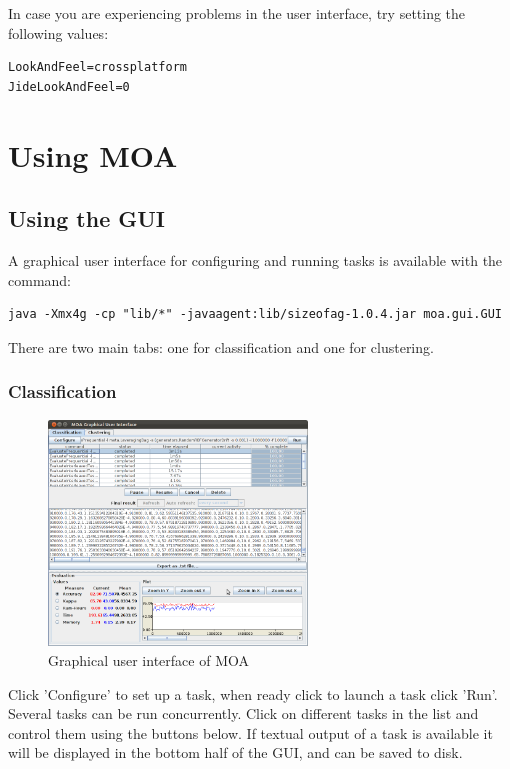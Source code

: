 \documentclass[a4paper,12pt,twoside]{book}
\begin{document}
In case you are experiencing problems in the user interface, try setting the
following values:
{\scriptsize
\begin{verbatim}
LookAndFeel=crossplatform
JideLookAndFeel=0
\end{verbatim}}

\chapter{Using MOA}
\section{Using the GUI}
A graphical user interface for configuring and running tasks is available with the command:

\begin{verbatim}
java -Xmx4g -cp "lib/*" -javaagent:lib/sizeofag-1.0.4.jar moa.gui.GUI
\end{verbatim}

There are two main tabs: one for classification and one for clustering.

\subsection{Classification}

\begin{figure}[ht]
\begin{center}
\includegraphics[height=6cm]{figures/MOA_Task.png}\end{center}
\caption{Graphical user interface of MOA}
\end{figure}

Click 'Configure' to set up a task, when ready click to launch a task click 'Run'. Several tasks can be run concurrently. Click on different tasks in the list and control them using the buttons below. If textual output of a task is available it will be displayed in the bottom half of the GUI, and can be saved to disk.
\end{document}
